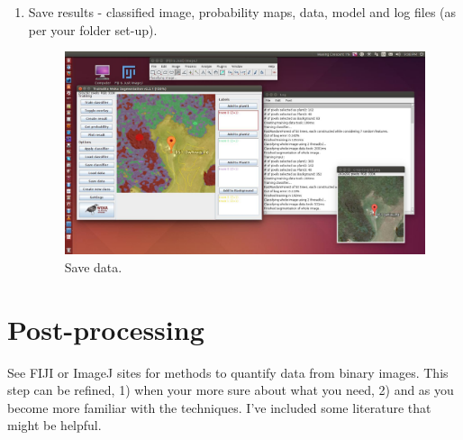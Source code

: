 \documentclass[letterpaper]{article}
\begin{document}
\begin{enumerate}
\item Save results - classified image, probability maps, data, model and log files (as per your folder set-up).

\begin{figure}[htps!]
\centering
\includegraphics[width=0.7\linewidth]{../e-tws/7}
\caption{Save data.}
\label{fig:8}
\end{figure} 
\end{enumerate}

\section{Post-processing}
See FIJI or ImageJ sites for methods to quantify data from binary images. This step can be refined, 1) when your more sure about what you need, 2) and as you become more familiar with the techniques. I've included some literature that might be helpful.
\end{document}
